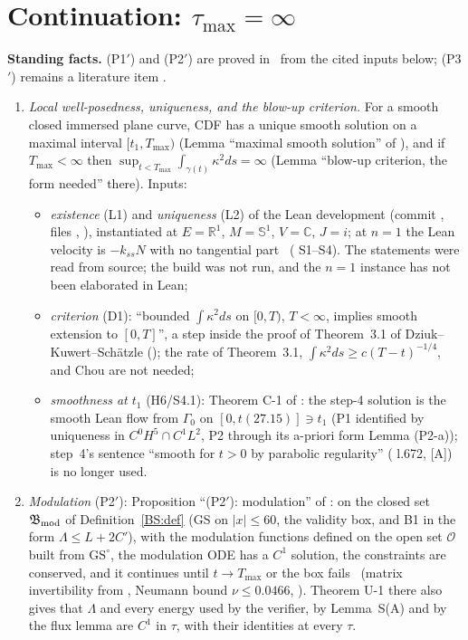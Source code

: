 \documentclass[11pt]{article}
\begin{document}
\section{Continuation: $\tau_{\max}=\infty$}\label{C:sec:cont}
\noindent\textbf{Standing facts.} (P1$'$) and (P2$'$) are proved in  \tH\ from the cited inputs below; (P3$'$) remains a literature item \tH.
\begin{enumerate}[label=(P\arabic*$'$),leftmargin=3em]
\item \emph{Local well-posedness, uniqueness, and the blow-up criterion.} For a smooth closed immersed plane curve, CDF has a unique smooth solution on a maximal interval $[t_1,T_{\max})$ (Lemma ``maximal smooth solution'' of ), and if $T_{\max}<\infty$ then $\sup_{t<T_{\max}}\int_{\gamma(t)}\kappa^2ds=\infty$ (Lemma ``blow-up criterion, the form needed'' there). Inputs:
  \begin{itemize}[leftmargin=*]
  \item \emph{existence} (L1)  and \emph{uniqueness} (L2)  of the Lean development  \cite{CWFlow} (commit , files , ), instantiated at $E=\mathbb R^1$, $M=\mathbb S^1$, $V=\mathbb C$, $J=i$; at $n=1$ the Lean velocity is $-k_{ss}N$ with no tangential part \tS\ ( S1--S4). The statements were read from source; the build was not run, and the $n=1$ instance has not been elaborated in Lean;
  \item \emph{criterion} (D1): ``bounded $\int\kappa^2ds$ on $[0,T)$, $T<\infty$, implies smooth extension to $[0,T]$'', a step inside the proof of Theorem~3.1 of Dziuk--Kuwert--Sch\"atzle \cite{DKS2002} (); the rate of Theorem~3.1, $\int\kappa^2ds\ge c(T-t)^{-1/4}$, and Chou \cite{Chou2003} are not needed;
  \item \emph{smoothness at $t_1$} (H6/S4.1): Theorem C-1 of  \tHd: the step-4 solution is the smooth Lean flow from $\Gamma_0$ on $[0,t(27.15)]\ni t_1$ (P1 identified by uniqueness in $C^0H^5\cap C^1L^2$, P2 through its a-priori form Lemma (P2-a)); step~4's sentence ``smooth for $t>0$ by parabolic regularity'' ( l.672, [A]) is no longer used.
  \end{itemize}
\item \emph{Modulation} (P2$'$): Proposition ``(P2$'$): modulation'' of : on the closed set $\mathfrak B_{\rm mod}$ of Definition~\ref{BS:def} (GS on $|x|\le60$, the validity box, and B1 in the form $\Lambda\le L+2C'$), with the modulation functions defined on the open set $\mathcal O$ built from $\mathrm{GS}^\circ$, the modulation ODE has a $C^1$ solution, the constraints are conserved, and it continues until $t\to T_{\max}$ or the box fails \tH\ (matrix invertibility from , Neumann bound $\nu\le0.0466$, \tR). Theorem U-1 there also gives that $\Lambda$ and every energy used by the verifier, by Lemma~S(A) and by the flux lemma are $C^1$ in $\tau$, with their identities at every $\tau$.

\end{enumerate}
\end{document}
